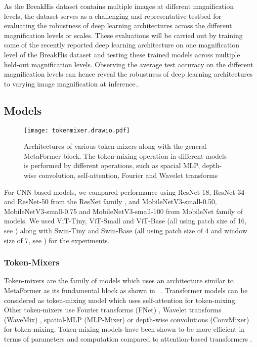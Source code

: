 \documentclass[nohyperref]{article}
\theoremstyle{plain}
\theoremstyle{definition}
\theoremstyle{remark}
\begin{document}
As the BreakHis \cite{spanhol2015dataset} dataset contains multiple images at different magnification levels, the dataset serves as a challenging and representative testbed for evaluating the robustness of deep learning architectures across the different magnification levels or scales. These evaluations will be carried out by training some of the recently reported deep learning architecture on one magnification level of the BreakHis \cite{spanhol2015dataset} dataset and testing these trained models across multiple held-out magnification levels. Observing the  average test accuracy   on the different  magnification levels can hence reveal the robustness of deep learning architectures to varying image magnification at inference..  





\subsection{Models}

\begin{figure*}[ht]
\vskip 0.2in
\begin{center}
\texttt{[image: tokenmixer.drawio.pdf]}
\caption{Architectures of various token-mixers along with the general MetaFormer block. The token-mixing operation in different models is performed by different operations, such as spacial MLP, depth-wise convolution, self-attention, Fourier and Wavelet transforms}
\label{fig:token}
\end{center}
\vskip -0.2in
\end{figure*}

For CNN based models, we compared performance using ResNet-18, ResNet-34 and ResNet-50 from the ResNet family \cite{he2016deep}, and MobileNetV3-small-0.50, MobileNetV3-small-0.75 and MobileNetV3-small-100 from MobileNet family of models. We used ViT-Tiny, ViT-Small and ViT-Base (all using patch size of 16, see \cite{dosovitskiy2021an}) along with Swin-Tiny and Swin-Base (all using patch size of 4 and window size of 7, see \cite{liu2021swin}) for the experiments.

\subsubsection{Token-Mixers}
Token-mixers are the family of models which uses an architecture similar to MetaFormer \cite{yu2022metaformer} as its fundamental block as shown in ~. Transformer models can be considered as token-mixing model which uses self-attention for token-mixing. Other token-mixers use Fourier transforms (FNet) \cite{lee2021fnet}, Wavelet transforms (WaveMix) \cite{https://doi.org/10.48550/arxiv.2205.14375}, spatial-MLP (MLP-Mixer) \cite{tolstikhin2021mlp} or depth-wise convolutions (ConvMixer) \cite{trockman2022patches} for token-mixing. Token-mixing models have been shown to be more efficient in terms of parameters and computation compared to attention-based transformers \cite{yu2022metaformer}.
\end{document}
